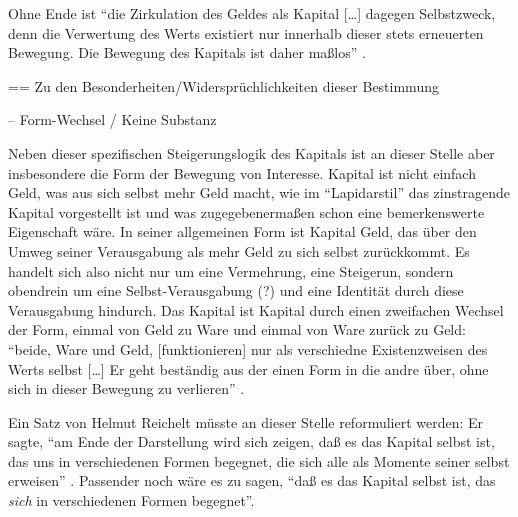 \documentclass[12pt,
               DIV13,
               paper=a4,
               twoside=false,
               onehalfspacing,
               bibliography=totoc,
               toc=graduated,
               draft,
               ]{scrartcl}
\newcommand{\lips}{\dots\unkern}
\newcommand{\pc}[2]{\parencite[#1]{#2}}
\newcommand{\worries}[1]{\ifdraft{\textcolor{blue}{\texttt{(#1)}}}{}}
\begin{document}
Ohne Ende ist "`die Zirkulation des Geldes als Kapital [\lips] dagegen
Selbstzweck, denn die Verwertung des Werts existiert nur innerhalb
dieser stets erneuerten Bewegung. Die Bewegung des Kapitals ist daher
maßlos"' \pc{167}{kap}.


== Zu den Besonderheiten/Widersprüchlichkeiten dieser Bestimmung

-- Form-Wechsel / Keine Substanz

Neben dieser spezifischen Steigerungslogik des Kapitals ist an dieser
Stelle aber insbesondere die Form der Bewegung von Interesse. Kapital
ist nicht einfach Geld, was aus sich selbst mehr Geld macht, wie im
"`Lapidarstil"' \pc{170}{kap} das zinstragende Kapital vorgestellt ist
und was zugegebenermaßen schon eine bemerkenswerte Eigenschaft wäre.
In seiner allgemeinen Form ist Kapital Geld, das über den Umweg seiner
Verausgabung als mehr Geld zu sich selbst zurückkommt. Es handelt sich
also nicht nur um eine Vermehrung, eine Steigerun, sondern obendrein
um eine Selbst-Verausgabung (?) und eine Identität durch diese
Verausgabung hindurch. Das Kapital ist Kapital durch einen zweifachen
Wechsel der Form, einmal von Geld zu Ware und einmal von Ware zurück
zu Geld: "`beide, Ware und Geld, [funktionieren] nur als verschiedne
Existenzweisen des Werts selbst [\lips] Er geht beständig aus der
einen Form in die andre über, ohne sich in dieser Bewegung zu
verlieren"' \pc{S. 168 f.}{kap}.

Ein Satz von Helmut Reichelt müsste an dieser Stelle reformuliert
werden: Er sagte, "`am Ende der Darstellung wird sich zeigen, daß es
das Kapital selbst ist, das uns in verschiedenen Formen begegnet, die
sich alle als Momente seiner selbst erweisen"' \pc{181}{reichelt}.
Passender noch wäre es zu sagen, "`daß es das Kapital selbst ist, das
\emph{sich} in verschiedenen Formen begegnet"'.



\end{document}
